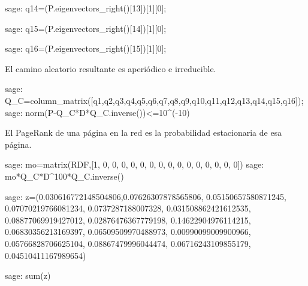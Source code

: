 \begin{sagecommandline}
    sage: q14=(P.eigenvectors_right()[13])[1][0];
\end{sagecommandline}

\begin{sagecommandline}
    sage: q15=(P.eigenvectors_right()[14])[1][0];
\end{sagecommandline}

\begin{sagecommandline}
    sage: q16=(P.eigenvectors_right()[15])[1][0];
\end{sagecommandline}

\par El camino aleatorio resultante es aperiódico e irreducible.

\begin{sagecommandline}
    sage: Q_C=column_matrix([q1,q2,q3,q4,q5,q6,q7,q8,q9,q10,q11,q12,q13,q14,q15,q16]);
    sage: norm(P-Q_C*D*Q_C.inverse())<=10^(-10)
\end{sagecommandline}

\par El PageRank de una página en la red es la probabilidad estacionaria de esa página.
    
\begin{sagecommandline}
    sage: mo=matrix(RDF,[1, 0, 0, 0, 0, 0, 0, 0, 0, 0, 0, 0, 0, 0, 0, 0])
    sage: mo*Q_C*D^100*Q_C.inverse()
\end{sagecommandline}

\begin{sagecommandline}
    sage: z=(0.030616772148504806,0.07626307878565806, 0.05150657580871245, 0.07070219766081234, 0.0737287188007328, 0.031508862421612535, 0.08877069919427012, 0.02876476367779198, 0.14622904976114215, 0.06830356213169397, 0.06509509970488973, 0.00990099009900966, 0.05766828706625104, 0.08867479996044474, 0.06716243109855179, 0.04510411167989654)
\end{sagecommandline}

\begin{sagecommandline}
    sage: sum(z)
\end{sagecommandline}


